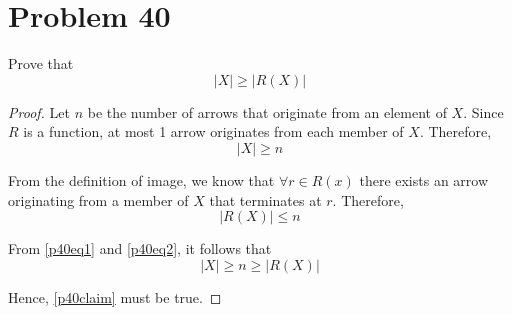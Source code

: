 \documentclass{article}
\begin{document}
\section{Problem 40}
Prove that
\begin{equation}\label{p40claim}
	|X| \ge |R(X)|
\end{equation}
\begin{proof}
	Let $n$ be the number of arrows that originate from an element of $X$.  Since $R$ is a function, at most 1 arrow originates from each member of $X$. Therefore,
	\begin{equation}\label{p40eq1}
		|X| \ge n
	\end{equation}

	From the definition of image, we know that $\forall r \in R(x)$ there exists an arrow originating from a member of $X$ that terminates at $r$. Therefore,
	\begin{equation}\label{p40eq2}
		|R(X)| \le n
	\end{equation}

	From \eqref{p40eq1} and \eqref{p40eq2}, it follows that
	\[
		|X| \ge n \ge |R(X)|
	\]

	Hence, \eqref{p40claim} must be true.

\end{proof}
\end{document}
